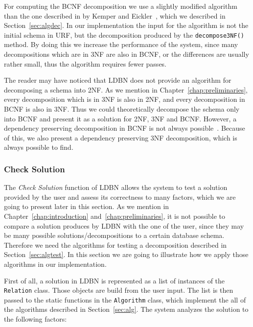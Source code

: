 For computing the BCNF decomposition we use a slightly modified algorithm than the one described
in by Kemper and Eickler~\cite{bdb2}, which we described in Section~\ref{sec:algdec}. In our implementation
the input for the algorithm is not the initial schema in URF, but the decomposition
produced by the \verb=decompose3NF()= method. By doing this we 
increase the performance of the system, since many decompositions which 
are in 3NF are also in BCNF, or the differences are usually rather small, thus the algorithm
requires fewer passes.   

The reader may have noticed that LDBN does not provide an algorithm for decomposing a schema into
2NF. As we mention in Chapter~\ref{chap:preliminaries}, every decomposition
which is in 3NF is also in 2NF, and every
decomposition in BCNF is also in 3NF. Thus we could theoretically decompose the schema only 
into BCNF and present it as a solution for 2NF, 3NF and BCNF. However, a dependency 
preserving decomposition in BCNF is not always possible~\cite{bdb1, bdb2, bdb3, bdb3}. 
Because of this, we also present a dependency preserving 3NF decomposition, which is always
possible to find.   

\subsubsection{Check Solution}  
The \textit{Check Solution} function of LDBN allows the system to test a solution 
provided by the user and assess its correctness to many factors, which
we are going to present later in this section. As we mention in Chapter~\ref{chap:introduction} 
and~\ref{chap:preliminaries}, it is not possible
to compare a solution produces by LDBN with the one of the user, since they may be many
possible solutions/decompositions to a certain database schema. Therefore we need the
algorithms for testing a decomposition described in Section~\ref{sec:algtest}. In this section
we are going to illustrate how we apply those algorithms in our implementation. 

First of all, a solution in LDBN is represented as a list of instances of the
\verb=Relation= class. Those objects are build from the user input. The list is then
passed to the static functions in the \verb=Algorithm= class, which 
implement the all of the algorithms described in Section~\ref{sec:alg}. 
The system analyzes the solution to the following factors:

